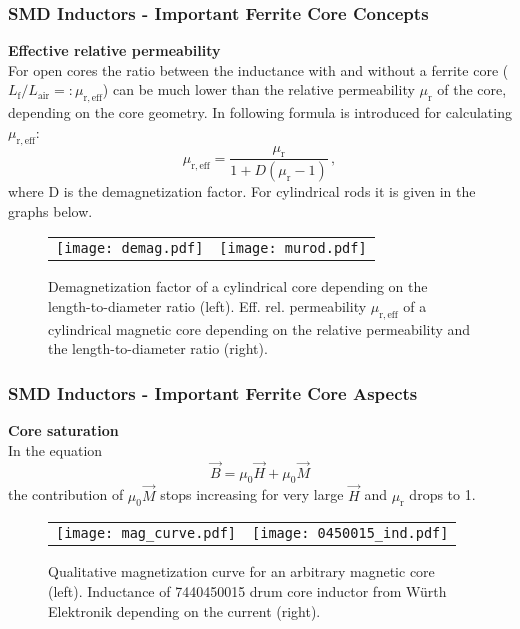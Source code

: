 \begin{frame}
	\frametitle{SMD Inductors - Important Ferrite Core Concepts}
	\textbf{Effective relative permeability}\\
	For open cores the ratio between the inductance with and without a ferrite core ($L_\mathrm{f}/L_\mathrm{air} =: \mu_\mathrm{r,eff}$) can be much lower than the relative permeability $\mu_\mathrm{r}$ of the core, depending on the core geometry. In \cite{snelling} following formula is introduced for calculating $\mu_\mathrm{r,eff}$:
	\begin{equation} \label{eqn:demag}
		\mu_{\mathrm{r,eff}} = \frac{\mu_\mathrm{r}}{1+D(\mu_\mathrm{r}-1)}\,,
	\end{equation}
	where D is the demagnetization factor. For cylindrical rods it is given in the graphs below.
	\vspace{-15pt}
	\begin{figure}
		\centering
		\begin{tabular}{cc}
			\texttt{[image: demag.pdf]}&
			\hspace{25pt}
			\texttt{[image: murod.pdf]}
		\end{tabular}
		\caption{Demagnetization factor of a cylindrical core depending on the length-to-diameter ratio (left). Eff. rel. permeability $\mu_\mathrm{r,eff}$ of a cylindrical magnetic core depending on the relative permeability and the length-to-diameter ratio (right).}
	\end{figure}
\end{frame}

\begin{frame}
	\frametitle{SMD Inductors - Important Ferrite Core Aspects}
	\textbf{Core saturation}\\
	In the equation
	\begin{equation}\label{eqn:magnetization}
		\vec{B} = \mu_0\vec{H}+\mu_0\vec{M}
	\end{equation}
	the contribution of $\mu_0\vec{M}$ stops increasing for very large $\vec{H}$ and $\mu_\mathrm{r}$ drops to 1. 
	\vspace{-15pt}
	\begin{figure}
		\centering
		\begin{tabular}{cc}
			\texttt{[image: mag\_curve.pdf]}&
			\hspace{25pt}
			\texttt{[image: 0450015\_ind.pdf]}
		\end{tabular}
		\caption{Qualitative magnetization curve for an arbitrary magnetic core (left). Inductance of 7440450015 drum core inductor from Würth Elektronik depending on the current (right).}
	\end{figure}
\end{frame}

